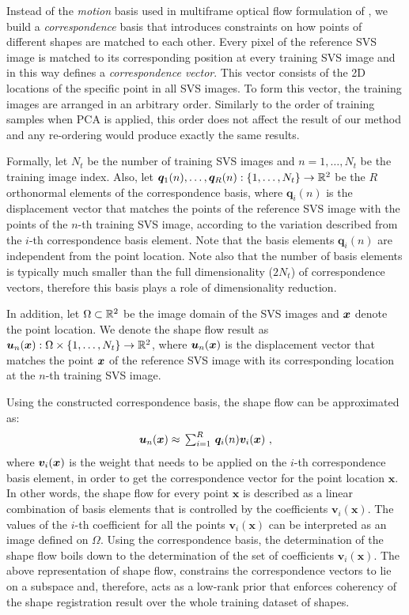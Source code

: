 Instead of the \emph{motion} basis used in multiframe optical flow formulation of \cite{Garg:2013hu}, we build a \emph{correspondence} basis that introduces constraints on how points of different shapes are matched to each other. Every pixel of the reference SVS image is matched to its corresponding position at every training SVS image and in this way defines a \emph{correspondence vector}. This vector consists of the 2D locations of the specific point in all SVS images. To form this vector, the training images are arranged in an arbitrary order. Similarly to the order of training samples when PCA is applied, this order does not affect the result of our method and any re-ordering would produce exactly the same results.


Formally, let $N_t$ be the number of training SVS images and $n=1,\ldots,N_t$ be the training image index. Also, let $\boldsymbol{q}_1(n),\ldots,\boldsymbol{q}_R(n):
\{1,\ldots,N_t\} \rightarrow \mathbb{R}^2$ be the $R$ orthonormal elements of the correspondence basis, where $\boldsymbol{q}_i(n)$ is the displacement vector that matches the points of the reference SVS image with the points of the $n$-th training SVS image, according to the variation described from the $i$-th correspondence basis element. Note that the basis elements $\boldsymbol{q}_i(n)$ are independent from the point location. Note also that the number of basis elements is typically much smaller than the full dimensionality ($2 N_t$) of correspondence vectors, therefore this basis plays a role of dimensionality reduction.


In addition, let $\Omega \subset \mathbb{R}^2$ be the image domain of the SVS images and $\boldsymbol{x}$ denote the point location. We denote the shape flow result as $\bm{u}_n(\boldsymbol{x}):\Omega\times \{1,\ldots,N_t\}
\rightarrow \mathbb{R}^2$,  where $\bm{u}_n(\boldsymbol{x})$ is the displacement vector that matches the point $\boldsymbol{x}$ of the reference SVS image with its corresponding location at the $n$-th training SVS image.

Using the constructed correspondence basis, the shape flow can be approximated as:
\vspace{-10pt}
\begin{equation}\label{eq:LinTrajModel}
    \bm{u}_n(\bx) \approx
    \textstyle \, \sum_{i=1}^R \, \bm{q}_i(n)\bm{v}_i(\bx) \,\, ,
\vspace{-10pt}
\end{equation}
where $\bm{v}_i(\boldsymbol{x})$ is the weight that needs to be applied on the $i$-th correspondence basis element, in order to get the correspondence vector for the point location $\bm{x}$. In other words, the shape flow for every point $\bm{x}$ is described as a linear combination of basis elements that is controlled by the coefficients $\bm{v}_i(\bm{x})$.
The values of the $i$-th coefficient for all the points $\bm{v}_i(\bm{x})$ can be interpreted as an image defined on $\Omega$. Using the correspondence basis, the determination of the shape flow boils down to the determination of the set of coefficients $\bm{v}_i(\bm{x})$. The above representation of shape flow, constrains the correspondence vectors to lie on a subspace and, therefore, acts as a low-rank prior that enforces coherency of the shape registration result over the whole training dataset of shapes.


